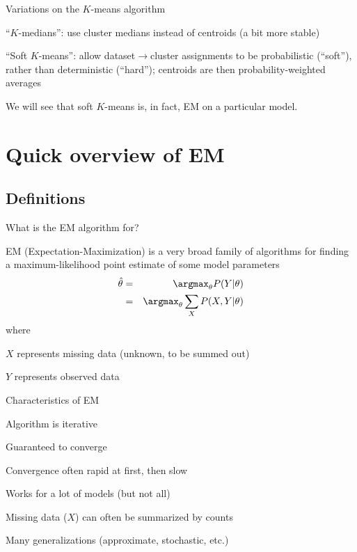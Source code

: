\documentclass{beamer}
\begin{document}
\begin{frame}{Variations on the $K$-means algorithm}

\itemb
\item ``$K$-medians'': use cluster medians instead of centroids (a bit more stable)
\item \alert{``Soft $K$-means'':} allow dataset$\to$cluster assignments to be probabilistic (``soft''), rather than deterministic (``hard'');
centroids are then probability-weighted averages
\iteme

We will see that soft $K$-means is, in fact, EM on a particular model.

\end{frame}


\section{Quick overview of EM}

\subsection{Definitions}

\begin{frame}{What is the EM algorithm for?}

EM (Expectation-Maximization) is a very broad family of algorithms
for finding a \alert{maximum-likelihood point estimate} of some model parameters
\begin{eqnarray*}
\hat{\theta} & = & \argmax_{\theta} P(Y|\theta) \\
& = & \argmax_{\theta} \sum_X P(X,Y|\theta)
\end{eqnarray*}
where
\itemb
\item $X$ represents \alert{missing data} (unknown, to be summed out)
\item $Y$ represents \alert{observed data}
\iteme

\end{frame}


\begin{frame}{Characteristics of EM}

\itemb
\item Algorithm is \alert{iterative}
 \itemb
 \item Guaranteed to converge
 \item Convergence often rapid at first, then slow
 \iteme
\item Works for a lot of models (but not all)
\item Missing data ($X$) can often be summarized by \alert{counts}
\item Many generalizations (approximate, stochastic, etc.)
\iteme

\end{frame}
\end{document}
